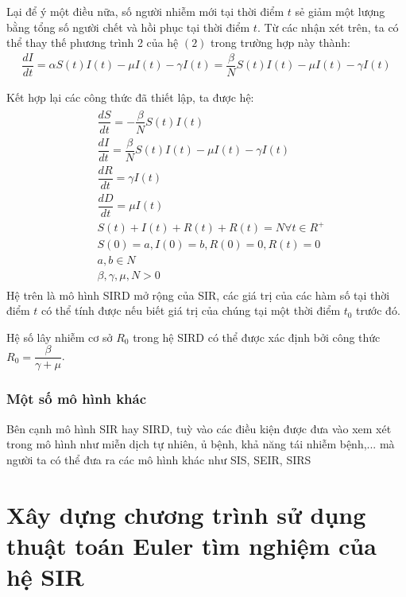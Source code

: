 \documentclass[a4paper]{article}
\begin{document}
Lại để ý một điều nữa, số người nhiễm mới tại thời điểm $t$ sẻ giảm một lượng bằng tổng số người chết và hồi phục tại thời điểm $t$. Từ các nhận xét trên, ta có thể thay thế phương trình 2 của hệ \hyperref[equations: 2]{$(2)$} 
trong trường hợp này thành:
\begin{align*}
    \dfrac{dI}{dt} = \alpha S(t)I(t) - \mu I(t) - \gamma I(t) =  \dfrac{\beta}{N} S(t)I(t) - \mu I(t) - \gamma I(t)
\end{align*}

Kết hợp lại các công thức đã thiết lập, ta được hệ:
\label{equations: 4}
\begin{align}
    \begin{split}
        & \dfrac{dS}{dt} = - \dfrac{\beta}{N} S(t)I(t) \\
        & \dfrac{dI}{dt} =  \dfrac{\beta}{N} S(t)I(t) - \mu I(t) - \gamma I(t) \\
        & \dfrac{dR}{dt} = \gamma I(t) \\
        &  \dfrac{dD}{dt} = \mu I(t) \\
        & S(t) + I(t) + R(t) + R(t) = N  \forall t \in R^{+} \\
        & S(0)=a, I(0)=b, R(0)=0, R(t) = 0 \\
        & a, b \in N \\
        & \beta, \gamma, \mu, N > 0 
    \end{split}
\end{align}
Hệ trên là mô hình SIRD mở rộng của SIR, các giá trị của các hàm số tại thời điểm $t$ có thể tính được nếu biết giá trị của chúng tại một thời điểm $t_0$ trước đó.

Hệ số lây nhiễm cơ sở $R_0$ trong hệ SIRD có thể được xác định bởi công thức $R_0 = \dfrac{\beta}{\gamma+\mu}$. 

\subsubsection{Một số mô hình khác}
Bên cạnh mô hình SIR hay SIRD, tuỳ vào các điều kiện được đưa vào xem xét trong mô hình như miễn dịch tự nhiên, ủ bệnh, khả năng tái nhiễm bệnh,... mà người ta có thể đưa ra các mô hình khác như SIS, SEIR, SIRS

\newpage
\section{Xây dựng chương trình sử dụng thuật toán Euler tìm nghiệm của hệ SIR }
\end{document}
